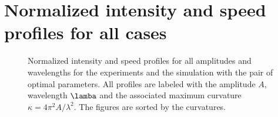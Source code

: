 \chapter{Normalized intensity and speed profiles for all cases}

\vspace{-30pt}
\begin{figure}[ht]
	\centering
	
	
\end{figure}
\newpage
\begin{figure}[ht]\ContinuedFloat
	\centering
	
	
	    
\end{figure}
\newpage
\begin{figure}[ht]\ContinuedFloat
	\centering 
	
	
	    
\end{figure}
\newpage
\begin{figure}[ht]\ContinuedFloat
	\centering
	
	
	    
\end{figure}
\newpage
\begin{figure}[ht]\ContinuedFloat
	\centering
	
	
	    
\end{figure}
\newpage

\begin{figure}[ht]\ContinuedFloat
	\centering
	
	
    \caption[Normalized intensity and speed profiles for all amplitudes and wavelengths for the experiments and the simulation with the pair of optimal parameters.]{Normalized intensity and speed profiles for all amplitudes and wavelengths for the experiments and the simulation with the pair of optimal parameters. All profiles are labeled with the amplitude $A$, wavelength $\lamba$ and the associated maximum curvature $\kappa=4\pi^2A/\lambda^2$. The figures are sorted by the curvatures. }    
\end{figure}